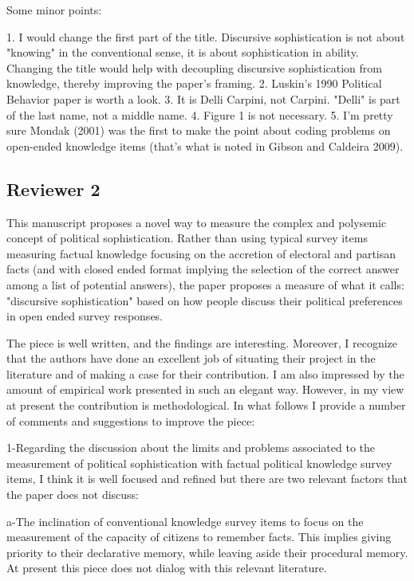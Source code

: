 Some minor points:

1.	I would change the first part of the title. Discursive sophistication is not about "knowing" in the conventional sense, it is about sophistication in ability. Changing the title would help with decoupling discursive sophistication from knowledge, thereby improving the paper's framing.
2.	Luskin's 1990 Political Behavior paper is worth a look.
3.	It is Delli Carpini, not Carpini. "Delli" is part of the last name, not a middle name.
4.	Figure 1 is not necessary.
5.	I'm pretty sure Mondak (2001) was the first to make the point about coding problems on open-ended knowledge items (that's what is noted in Gibson and Caldeira 2009).


\subsection*{Reviewer 2}

This manuscript proposes a novel way to measure the complex and polysemic concept of political sophistication. Rather than using typical survey items measuring factual knowledge focusing on the accretion of electoral and partisan facts (and with closed ended format implying the selection of the correct answer among a list of potential answers), the paper proposes a measure of what it calls: "discursive sophistication" based on how people discuss their political preferences in open ended survey responses. 

The piece is well written, and the findings are interesting. Moreover, I recognize that the authors have done an excellent job of situating their project in the literature and of making a case for their contribution. I am also impressed by the amount of empirical work presented in such an elegant way. However, in my view at present the contribution is methodological. In what follows I provide a number of comments and suggestions to improve the piece:

1-Regarding the discussion about the limits and problems associated to the measurement of political sophistication with factual political knowledge survey items, I think it is well focused and refined but there are two relevant factors that the paper does not discuss: 

a-The inclination of conventional knowledge survey items to focus on the measurement of the capacity of citizens to remember facts. This implies giving priority to their declarative memory, while leaving aside their procedural memory. At present this piece does not dialog with this relevant literature.

